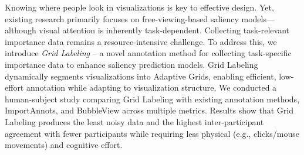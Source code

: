 Knowing where people look in visualizations is key to effective design. Yet, existing research primarily focuses on free-viewing-based saliency models--- although visual attention is inherently task-dependent. 
Collecting task-relevant importance data remains a resource-intensive challenge.
To address this, we introduce \textit{Grid Labeling} -- a novel annotation method for collecting task-specific importance data to enhance saliency prediction models. 
Grid Labeling dynamically segments visualizations into Adaptive Grids, enabling efficient, low-effort annotation while adapting to visualization structure.
We conducted a human-subject study comparing Grid Labeling with existing annotation methods, ImportAnnots, and BubbleView across multiple metrics. 
Results show that Grid Labeling produces the least noisy data and the highest inter-participant agreement with fewer participants while requiring less physical (e.g., clicks/mouse movements) and cognitive effort.